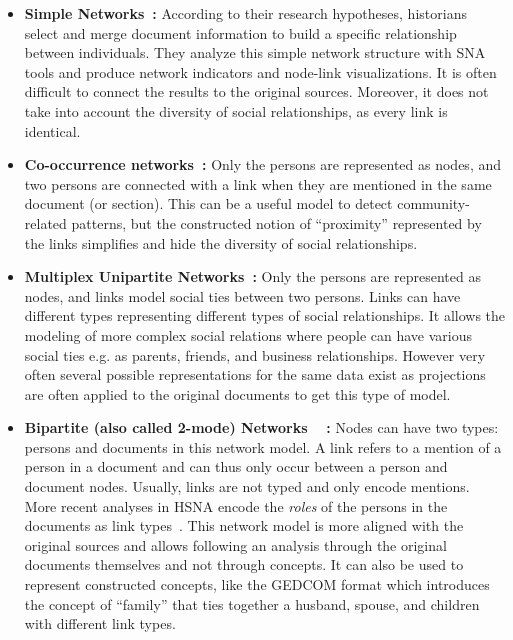 \begin{itemize}[nosep,leftmargin=*]
    \item \textbf{Simple Networks~\cite{wetherellHistoricalSocialNetwork1998}:} According to their research hypotheses, historians select and merge document information to build a specific relationship between individuals. They analyze this simple network structure with SNA tools and produce network indicators and node-link visualizations. It is often difficult to connect the results to the original sources. Moreover, it does not take into account the diversity of social relationships, as every link is identical.
    \item \textbf{Co-occurrence networks~\cite{sairioMethodologicalPracticalAspects2009}:}
    Only the persons are represented as nodes, and two persons are connected with a link when they are mentioned in the same document (or section). This can be a useful model to detect community-related patterns, but the constructed notion of ``proximity'' represented by the links simplifies and hide the diversity of social relationships.
    \item \textbf{Multiplex Unipartite Networks~\cite{eriksonMalfeasanceFoundationsGlobal2006}:} Only the persons are represented as nodes, and links model social ties between two persons. Links can have different types representing different types of social relationships. It allows the modeling of more complex social relations where people can have various social ties e.g. as parents, friends, and business relationships. However very often several possible representations for the same data exist as projections are often applied to the original documents to get this type of model.
    \item \textbf{Bipartite (also called 2-mode) Networks
    ~\cite{hambergerScanningPatternsRelationship2014}
    :} Nodes can have two types: persons and documents in this network model. A link refers to a mention of a person in a document and can thus only occur between a person and document nodes. Usually, links are not typed and only encode mentions.
    More recent analyses in HSNA encode the \emph{roles} of the persons in the documents as link types~\cite{Cristofoli2018}. This network model is more aligned with the original sources and allows following an analysis through the original documents themselves and not through concepts. It can also be used to represent constructed concepts, like the GEDCOM format which introduces the concept of ``family'' that ties together a husband, spouse, and children with different link types.

\end{itemize}
